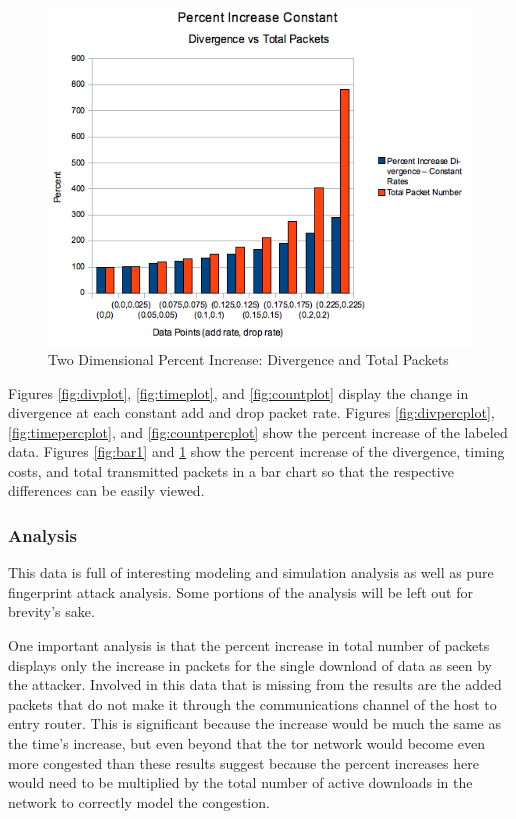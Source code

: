 \documentclass{article}
\begin{document}
\begin{figure}
	\centering
		\includegraphics[scale=0.55]{../../code/plots/perc_increase_div_tpacks_constant.png}
	\caption{Two Dimensional Percent Increase: Divergence and Total Packets}
	\label{fig:bar2}
\end{figure}
Figures \ref{fig:divplot}, \ref{fig:timeplot}, and \ref{fig:countplot} 
display the change in divergence at each constant add and drop
packet rate. Figures \ref{fig:divpercplot}, \ref{fig:timepercplot}, and 
\ref{fig:countpercplot} show the percent increase of the labeled data. 
Figures \ref{fig:bar1} and \ref{fig:bar2} show the percent 
increase of the divergence, timing costs, and total transmitted packets in a 
bar chart so that the respective differences can be easily viewed. 

\subsubsection{Analysis}
This data is full of interesting modeling and simulation analysis as well as 
pure fingerprint attack analysis. Some portions of the analysis will be left 
out for brevity's sake.

One important analysis is that the percent increase in total number of packets
displays only the increase in packets for the single download of data as seen
by the attacker. Involved in this data that is missing from the results are 
the added packets that do not make it through the communications channel of the
host to entry router. This is significant because the increase would be much
the same as the time's increase, but even beyond that the tor network would 
become even more congested than these results suggest because the percent
increases here would need to be multiplied by the total number of active 
downloads in the network to correctly model the congestion. 
\end{document}
